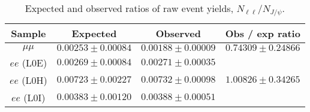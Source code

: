 \begin{table}[h]
\centering
 \caption{Expected and observed ratios of raw event yields, $N_{\ell\ell} / N_{J/\psi}$. }
\begin{tabular}{|c|c|c|c|}
\hline
 Sample 			& Expected 			& Observed 			& Obs / exp ratio \\ \hline
$\mu\mu$ 	& $ 0.00253  \pm  0.00084 $ 	& $ 0.00188  \pm  0.00009 $ 	& $ 0.74309  \pm  0.24866 $ \\
\hline
$ee$ (L0E) 	& $ 0.00269  \pm  0.00084 $ 	& $ 0.00271  \pm  0.00035 $ 	&  \\
$ee$ (L0H) 	& $ 0.00723  \pm  0.00227 $ 	& $ 0.00732  \pm  0.00098 $ 	& $ 1.00826  \pm  0.34265 $ \\
$ee$ (L0I) 	& $ 0.00383  \pm  0.00120 $ 	& $ 0.00388  \pm  0.00051 $ 	&  \\
\hline 
 \end{tabular}
 \label{tab:RKst_expectations}
\end{table}

\clearpage
